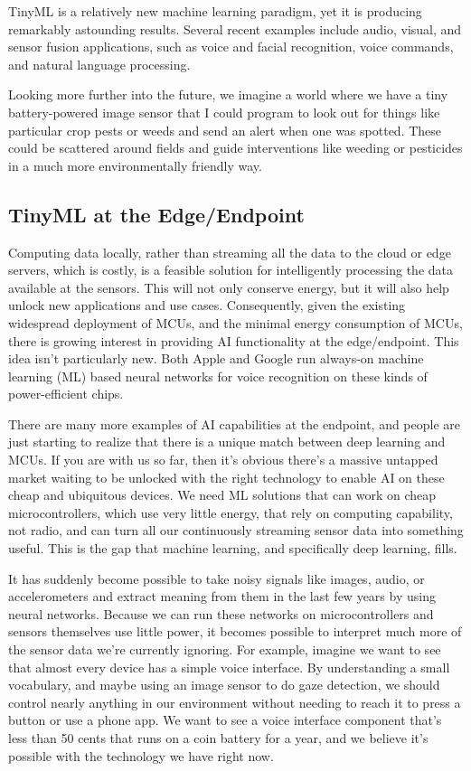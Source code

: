 TinyML is a relatively new machine learning paradigm, yet it is producing remarkably astounding results. Several recent examples include audio, visual, and sensor fusion applications, such as voice and facial recognition, voice commands, and natural language processing.

Looking more further into the future, we imagine a world where we have a tiny battery-powered image sensor that I could program to look out for things like particular crop pests or weeds and send an alert when one was spotted. These could be scattered around fields and guide interventions like weeding or pesticides in a much more environmentally friendly way.

\subsection{TinyML at the Edge/Endpoint}

Computing data locally, rather than streaming all the data to the cloud or edge servers, which is costly, is a feasible solution for intelligently processing the data available at the sensors. This will not only conserve energy, but it will also help unlock new applications and use cases. Consequently, given the existing widespread deployment of MCUs, and the minimal energy consumption of MCUs, there is growing interest in providing AI functionality at the edge/endpoint. This idea isn’t particularly new. Both Apple and Google run always-on machine learning (ML) based neural networks for voice recognition on these kinds of power-efficient chips.

There are many more examples of AI capabilities at the endpoint, and people are just starting to realize that there is a unique match between deep learning and MCUs. If you are with us so far, then it’s obvious there's a massive untapped market waiting to be unlocked with the right technology to enable AI on these cheap and ubiquitous devices. We need ML solutions that can work on cheap microcontrollers, which use very little energy, that rely on computing capability, not radio, and can turn all our continuously streaming sensor data into something useful. This is the gap that machine learning, and specifically deep learning, fills.

It has suddenly become possible to take noisy signals like images, audio, or accelerometers and extract meaning from them in the last few years by using neural networks. Because we can run these networks on microcontrollers and sensors themselves use little power, it becomes possible to interpret much more of the sensor data we’re currently ignoring. For example, imagine we want to see that almost every device has a simple voice interface. By understanding a small vocabulary, and maybe using an image sensor to do gaze detection, we should control nearly anything in our environment without needing to reach it to press a button or use a phone app. We want to see a voice interface component that’s less than 50 cents that runs on a coin battery for a year, and we believe it’s possible with the technology we have right now.

